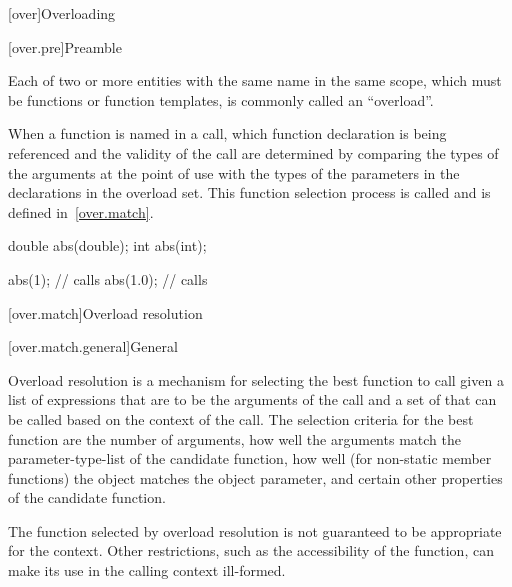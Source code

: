 [over]{Overloading}%


[over.pre]{Preamble}

\pnum
{}%
%
\begin{note}
Each of two or more entities with the same name in the same scope,
which must be functions or function templates,
is commonly called an ``overload''.
\end{note}

\pnum
When a function is named in a call, which function
declaration is being referenced and the validity of the call
are determined by comparing the types
of the arguments at the point of use with the types of the parameters
in the declarations in the overload set.
This function selection process is called
 and is defined in~\ref{over.match}.
\begin{example}
%
\begin{codeblock}
double abs(double);
int abs(int);

abs(1);             // calls 
abs(1.0);           // calls 
\end{codeblock}
\end{example}

[over.match]{Overload resolution}%

[over.match.general]{General}%
%
%

\pnum
Overload resolution is a mechanism for selecting the best
function to call given a list of expressions that are to be the
arguments of the call and a set of
that can
be called based on the context of the call.
The selection
criteria for the best function are the number of arguments, how
well the arguments match the parameter-type-list of the
candidate function,
how well (for non-static member functions) the object
matches the object parameter,
and certain other properties of the candidate function.
\begin{note}
The function selected by overload resolution is not
guaranteed to be appropriate for the context.
Other restrictions,
such as the accessibility of the function, can make its use in
the calling context ill-formed.
\end{note}

